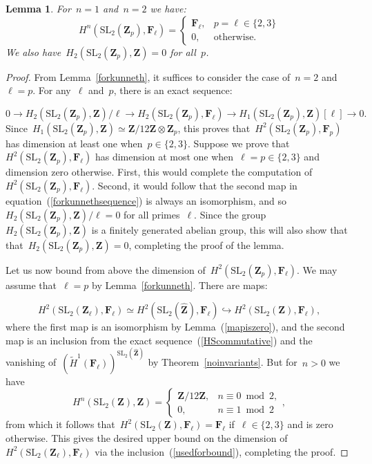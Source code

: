 \documentclass[10pt]{amsart}
\def\Zhat{\widehat{\Z}}
\def\Htw{\widetilde{H}}
\def\F{\mathbf{F}}
\def\Z{\mathbf{Z}}
\newtheorem{lemma}[subsubsection]{Lemma}
\theoremstyle{remark}
\numberwithin{equation}{subsection}
\def\numequation{\addtocounter{subsubsection}{1}\begin{equation}}
\def\SL{\mathrm{SL}}
\begin{document}
\begin{lemma} \label{postkunneth}
 For~$n=1$ and~$n=2$ we have:
$$H^n(\SL_2(\Z_p),\F_{\ell})  = 
\begin{cases} \F_{\ell}, & p=\ell \in \{2,3\} \\
0, & \text{otherwise}. \end{cases}
$$
We also have~$H_2(\SL_2(\Z_p),\Z) = 0$ for all~$p$.
\end{lemma}

\begin{proof} 
From  Lemma~\ref{forkunneth},
it suffices to consider the case of~$n=2$ and~$\ell = p$.
For any~$\ell$ and~$p$,
there is an exact sequence:
\numequation
\label{forkunnethsequence}
0 \rightarrow H_2(\SL_2(\Z_p),\Z)/\ell
\rightarrow H_2(\SL_2(\Z_p),\F_{\ell}) 
\rightarrow H_1(\SL_2(\Z_p),\Z)[\ell] \rightarrow 0.
\end{equation}
Since~$H_1(\SL_2(\Z_p),\Z) \simeq \Z/12\Z \otimes \Z_p$,
this proves that~$H^2(\SL_2(\Z_p),\F_p)$ has dimension
at least one when~$p \in \{2,3\}$.
Suppose we prove that~$H^2(\SL_2(\Z_p),\F_{\ell})$
has dimension at most one when~$\ell = p \in \{2,3\}$ and dimension zero otherwise.
First, this would complete the computation of~$H^2(\SL_2(\Z_p),\F_{\ell})$.
Second, it would follow that the second map in equation~(\ref{forkunnethsequence})
is always an isomorphism, and so~$H_2(\SL_2(\Z_p),\Z)/\ell = 0$
for all primes~$\ell$.
Since the group~$H_2(\SL_2(\Z_p),\Z)$
is  a finitely generated abelian group, this will also show that
 that~$H_2(\SL_2(\Z_p),\Z) = 0$, completing the proof of the lemma.
 
 Let us now bound from above the dimension of~$H^2(\SL_2(\Z_p),\F_{\ell})$.
 We may assume that~$\ell = p$ by Lemma~\ref{forkunneth}.
 There are maps:
 \numequation
 \label{usedforbound}
 H^2(\SL_2(\Z_{\ell}),\F_{\ell}) \simeq
H^2(\SL_2(\Zhat),\F_{{\ell}}) \hookrightarrow H^2(\SL_2(\Z),\F_{{\ell}}),
\end{equation}
where the first map is an isomorphism
by Lemma~(\ref{mapiszero}), and the second map is an inclusion
from the exact sequence~(\ref{HScommutative})
and the vanishing of~$(\Htw^1(\F_{\ell}))^{\SL_2(\Zhat)}$
by Theorem~\ref{noinvariants}.
But for~$n > 0$ we have
$$H^n(\SL_2(\Z),\Z) = \begin{cases} \Z/12\Z, & n \equiv 0 \bmod 2, \\
0, & n \equiv 1 \bmod 2 \end{cases},$$
from which it follows that~$H^2(\SL_2(\Z),\F_{\ell}) = \F_{\ell}$
if~$\ell \in \{2,3\}$ and is zero otherwise.
This gives the desired upper bound on the dimension
of~$H^2(\SL_2(\Z_{\ell}),\F_{\ell})$ via 
the inclusion~(\ref{usedforbound}), completing the proof.
\end{proof}
\end{document}

